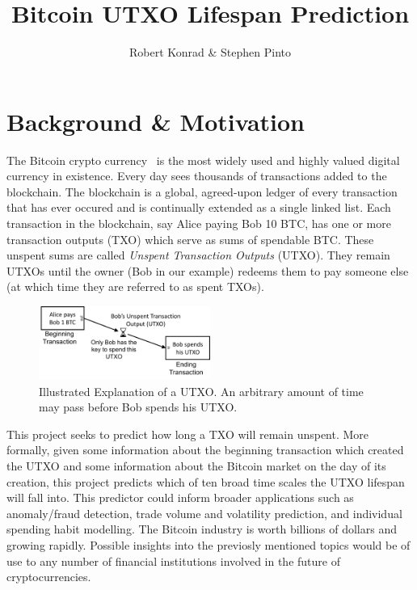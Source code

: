 \documentclass[11pt]{article}
\title{Bitcoin UTXO Lifespan Prediction}
\author{Robert Konrad \& Stephen Pinto}
\begin{document}
\maketitle

\section{Background \& Motivation}
The Bitcoin crypto currency~\cite{Na:08,NBF:15} is the most widely used and highly valued digital currency in existence. Every day sees thousands of transactions added to the blockchain. The blockchain is a global, agreed-upon ledger of every transaction that has ever occured and is continually extended as a single linked list. Each transaction in the blockchain, say Alice paying Bob 10 BTC, has one or more transaction outputs (TXO) which serve as sums of spendable BTC. These unspent sums are called \emph{Unspent Transaction Outputs} (UTXO). They remain UTXOs until the owner (Bob in our example) redeems them to pay someone else (at which time they are referred to as spent TXOs).

\begin{figure}
\begin{center}
\includegraphics[width=0.5\textwidth]{figures/utxo}
\end{center}
\caption{Illustrated Explanation of a UTXO. An arbitrary amount of time may pass before Bob spends his UTXO.}
\label{utxo}
\end{figure}

This project seeks to predict how long a TXO will remain unspent. More formally, given some information about the beginning transaction which created the UTXO and some information about the Bitcoin market on the day of its creation, this project predicts which of ten broad time scales the UTXO lifespan will fall into. This predictor could inform broader applications such as anomaly/fraud detection, trade volume and volatility prediction, and individual spending habit modelling. The Bitcoin industry is worth billions of dollars and growing rapidly. Possible insights into the previosly mentioned topics would be of use to any number of financial institutions involved in the future of cryptocurrencies. 
\end{document}
